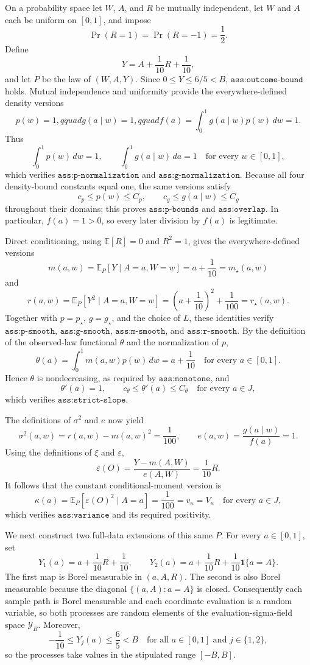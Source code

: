 On a probability space let \(W\), \(A\), and \(R\) be mutually independent, let \(W\) and \(A\) each be uniform on \([0,1]\), and impose
\[
 \Pr(R=1)=\Pr(R=-1)=\frac12.
\]
Define
\[
 Y=A+\frac1{10}R+\frac1{10},
\]
and let \(P\) be the law of \((W,A,Y)\).  Since \(0\le Y\le6/5<B\), \(\texttt{ass:outcome-bound}\) holds.  Mutual independence and uniformity provide the everywhere-defined density versions
\[
 p(w)=1,qquad g(a\mid w)=1,qquad
 f(a)=\int_0^1g(a\mid w)p(w)\,dw=1.
\]
Thus
\[
 \int_0^1p(w)\,dw=1,
 \qquad
 \int_0^1g(a\mid w)\,da=1\quad\text{for every }w\in[0,1],
\]
which verifies \(\texttt{ass:p-normalization}\) and \(\texttt{ass:g-normalization}\).  Because all four density-bound constants equal one, the same versions satisfy
\[
 c_p\le p(w)\le C_p,
 \qquad
 c_g\le g(a\mid w)\le C_g
\]
throughout their domains; this proves \(\texttt{ass:p-bounds}\) and \(\texttt{ass:overlap}\).  In particular, \(f(a)=1>0\), so every later division by \(f(a)\) is legitimate.

Direct conditioning, using \(\mathbb E[R]=0\) and \(R^2=1\), gives the everywhere-defined versions
\[
 m(a,w)=\mathbb E_P[Y\mid A=a,W=w]=a+\frac1{10}=m_\star(a,w)
\]
and
\[
 r(a,w)=\mathbb E_P[Y^2\mid A=a,W=w]
 =\left(a+\frac1{10}\right)^2+\frac1{100}=r_\star(a,w).
\]
Together with \(p=p_\star\), \(g=g_\star\), and the choice of \(L\), these identities verify \(\texttt{ass:p-smooth}\), \(\texttt{ass:g-smooth}\), \(\texttt{ass:m-smooth}\), and \(\texttt{ass:r-smooth}\).  By the definition of the observed-law functional \(\theta\) and the normalization of \(p\),
\[
 \theta(a)=\int_0^1m(a,w)p(w)\,dw=a+\frac1{10}
 \quad\text{for every }a\in[0,1].
\]
Hence \(\theta\) is nondecreasing, as required by \(\texttt{ass:monotone}\), and
\[
 \theta'(a)=1,
 \qquad c_{\theta}\le\theta'(a)\le C_{\theta}
 \quad\text{for every }a\in J,
\]
which verifies \(\texttt{ass:strict-slope}\).

The definitions of \(\sigma^2\) and \(e\) now yield
\[
 \sigma^2(a,w)=r(a,w)-m(a,w)^2=\frac1{100},
 \qquad e(a,w)=\frac{g(a\mid w)}{f(a)}=1.
\]
Using the definitions of \(\xi\) and \(\varepsilon\),
\[
 \varepsilon(O)=\frac{Y-m(A,W)}{e(A,W)}=\frac1{10}R.
\]
It follows that the constant conditional-moment version is
\[
 \kappa(a)=\mathbb E_P[\varepsilon(O)^2\mid A=a]
 =\frac1{100}=v_{\kappa}=V_{\kappa}
 \quad\text{for every }a\in J,
\]
which verifies \(\texttt{ass:variance}\) and its required positivity.

We next construct two full-data extensions of this same \(P\).  For every \(a\in[0,1]\), set
\[
 Y_1(a)=a+\frac1{10}R+\frac1{10},
 \qquad
 Y_2(a)=a+\frac1{10}R+\frac1{10}\mathbf 1\{a=A\}.
\]
The first map is Borel measurable in \((a,A,R)\).  The second is also Borel measurable because the diagonal \(\{(a,A):a=A\}\) is closed.  Consequently each sample path is Borel measurable and each coordinate evaluation is a random variable, so both processes are random elements of the evaluation-sigma-field space \(\mathcal Y_B\).  Moreover,
\[
 -\frac1{10}\le Y_j(a)\le\frac65<B
 \quad\text{for all }a\in[0,1]\text{ and }j\in\{1,2\},
\]
so the processes take values in the stipulated range \([-B,B]\).


